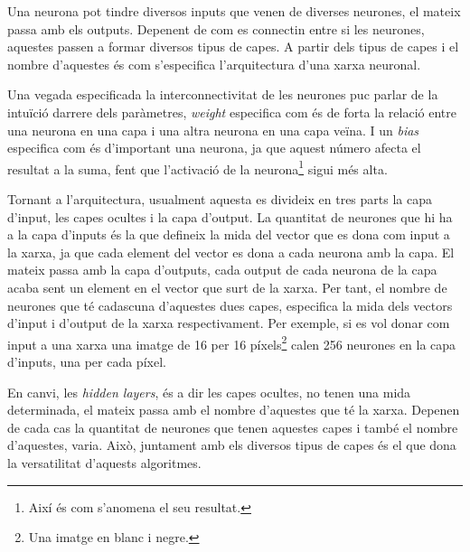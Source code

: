 Una neurona pot tindre diversos inputs que venen de diverses neurones, el mateix passa amb els outputs. Depenent de com es connectin entre si les neurones, aquestes passen a formar diversos tipus de capes. A partir dels tipus de capes i el nombre d'aquestes és com s'especifica l'arquitectura d'una xarxa neuronal.

Una vegada especificada la interconnectivitat de les neurones puc parlar de la intuïció darrere dels paràmetres, \textit{weight} especifica com és de forta la relació entre una neurona en una capa i una altra neurona en una capa veïna. I un \textit{bias} especifica com és d'important una neurona, ja que aquest número afecta el resultat a la suma, fent que l'activació de la neurona\footnote{Així és com s'anomena el seu resultat.} sigui més alta.

Tornant a l'arquitectura, usualment aquesta es divideix en tres parts la capa d'input, les capes ocultes i la capa d'output. La quantitat de neurones que hi ha a la capa d'inputs és la que defineix la mida del vector que es dona com input a la xarxa, ja que cada element del vector es dona a cada neurona amb la capa. El mateix passa amb la capa d'outputs, cada output de cada neurona de la capa acaba sent un element en el vector que surt de la xarxa. Per tant, el nombre de neurones que té cadascuna d'aquestes dues capes, especifica la mida dels vectors d'input i d'output de la xarxa respectivament. Per exemple, si es vol donar com input a una xarxa una imatge de 16 per 16 píxels\footnote{Una imatge en blanc i negre.} calen 256 neurones en la capa d'inputs, una per cada píxel.

En canvi, les \textit{hidden layers}, és a dir les capes ocultes, no tenen una mida determinada, el mateix passa amb el nombre d'aquestes que té la xarxa. Depenen de cada cas la quantitat de neurones que tenen aquestes capes i també el nombre d'aquestes, varia. Això, juntament amb els diversos tipus de capes és el que dona la versatilitat d'aquests algoritmes.

